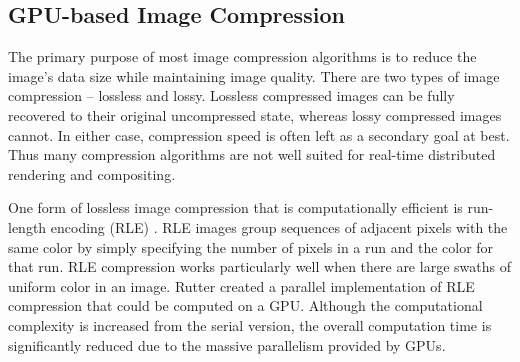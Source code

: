 \documentclass{vgtc}                          %
\begin{document}
\subsection{GPU-based Image Compression}
The primary purpose of most image compression algorithms is to reduce the image's data size while maintaining image quality. There are two types of image compression -- lossless and lossy. Lossless compressed images can be fully recovered to their original uncompressed state, whereas lossy compressed images cannot. In either case, compression speed is often left as a secondary goal at best. Thus many compression algorithms are not well suited for real-time distributed rendering and compositing.

One form of lossless image compression that is computationally efficient is run-length encoding (RLE) \cite{Robinson_1967}. RLE images group sequences of adjacent pixels with the same color by simply specifying the number of pixels in a run and the color for that run. RLE compression works particularly well when there are large swaths of uniform color in an image. Rutter \cite{Rutter_2011} created a parallel implementation of RLE compression that could be computed on a GPU. Although the computational complexity is increased from the serial version, the overall computation time is significantly reduced due to the massive parallelism provided by GPUs.

\end{document}
